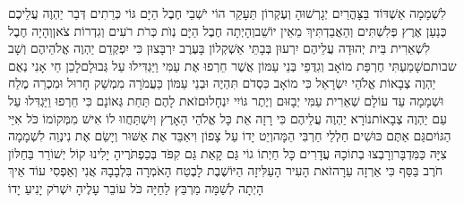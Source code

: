 \documentclass[../main/main.tex]{subfiles}
\begin{document}
\begin{multicols}{\ncols}
לִשְׁמָמָה אַשְׁדּוֹד בַּצָּהֳרַיִם יְגָרְשׁוּהָ וְעֶקְרוֹן תֵּעָקֵר \ClosedSection{}הוֹי יֹשְׁבֵי חֶבֶל הַיָּם גּוֹי כְּרֵתִים דְּבַר יַהְוֶה עֲלֵיכֶם כְּנַעַן אֶרֶץ פְּלִשְׁתִּים וְהַאֲבַדְתִּיךְ מֵאֵין יוֹשֵׁב\PreVerseSpace{}וְהָיְתָה חֶבֶל הַיָּם נְוֺת כְּרֹת רֹעִים וְגִדְרוֹת צֹאן\PreVerseSpace{}וְהָיָה חֶבֶל לִשְׁאֵרִית בֵּית יְהוּדָה עֲלֵיהֶם יִרְעוּן בְּבָתֵּי אַשְׁקְלוֹן בָּעֶרֶב יִרְבָּצוּן כִּי יִפְקְדֵם יַהְוֶה אֱלֹהֵיהֶם וְשָׁב שבותם\PreVerseSpace{}שָׁמַעְתִּי חֶרְפַּת מוֹאָב וְגִדֻּפֵי בְּנֵי עַמּוֹן אֲשֶׁר חֵרְפוּ אֶת עַמִּי וַיַּגְדִּילוּ עַל גְּבוּלָם\PreVerseSpace{}לָכֵן חַי אָנִי נְאֻם יַהְוֶה צְבָאוֹת אֱלֹהֵי יִשְׂרָאֵל כִּי מוֹאָב כִּסְדֹם תִּהְיֶה וּבְנֵי עַמּוֹן כַּעֲמֹרָה מִמְשַׁק חָרוּל וּמִכְרֵה מֶלַח וּשְׁמָמָה עַד עוֹלָם שְׁאֵרִית עַמִּי יְבָזּוּם וְיֶתֶר גּוֹיִי\SubEnd{} יִנְחָלוּם\PreVerseSpace{}זֹאת לָהֶם תַּחַת גְּאוֹנָם כִּי חֵרְפוּ וַיַּגְדִּלוּ עַל עַם יַהְוֶה צְבָאוֹת\PreVerseSpace{}נוֹרָא יַהְוֶה עֲלֵיהֶם כִּי רָזָה אֵת כָּל אֱלֹהֵי הָאָרֶץ וְיִשְׁתַּחֲווּ לוֹ אִישׁ מִמְּקוֹמוֹ כֹּל אִיֵּי הַגּוֹיִם\PreVerseSpace{}גַּם אַתֶּם כּוּשִׁים חַלְלֵי חַרְבִּי הֵמָּה\PreVerseSpace{}וְיֵט יָדוֹ עַל צָפוֹן וִיאַבֵּד אֶת אַשּׁוּר וְיָשֵׂם אֶת נִינְוֵה לִשְׁמָמָה צִיָּה כַּמִּדְבָּר\PreVerseSpace{}וְרָבְצוּ בְתוֹכָהּ עֲדָרִים כָּל חַיְתוֹ גוֹי גַּם קָאַת גַּם קִפֹּד בְּכַפְתֹּרֶיהָ יָלִינוּ קוֹל יְשׁוֹרֵר בַּחַלּוֹן חֹרֶב בַּסַּף כִּי אַרְזָה עֵרָה\PreVerseSpace{}זֹאת הָעִיר הָעַלִּיזָה הַיּוֹשֶׁבֶת לָבֶטַח הָאֹמְרָה בִּלְבָבָהּ אֲנִי וְאַפְסִי עוֹד אֵיךְ הָיְתָה לְשַׁמָּה מַרְבֵּץ לַחַיָּה כֹּל עוֹבֵר עָלֶיהָ יִשְׁרֹק יָנִיעַ יָדוֹ\OpenSection{}\par

\end{multicols}
\end{document}
